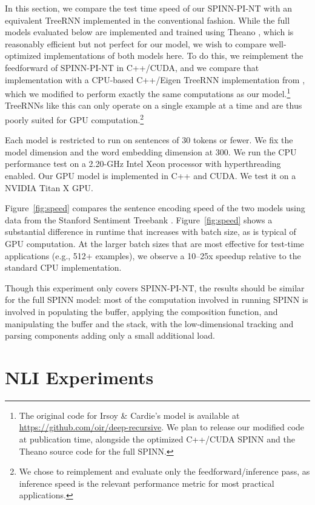 \documentclass[11pt]{article}
\begin{document}
In this section, we compare the test time speed of our SPINN-PI-NT with an equivalent TreeRNN implemented in the conventional fashion. While the full models evaluated below are implemented and trained using Theano \citep{bergstra+al:2010-scipy,Bastien-Theano-2012}, which is reasonably efficient but not perfect for our model, we wish to compare well-optimized implementations of both models here. To do this, we reimplement the feedforward of SPINN-PI-NT in C++/CUDA, and we compare that implementation with a CPU-based C++/Eigen TreeRNN implementation from \citet{irsoy2014deep}, which we modified to perform exactly the same computations as our model.\footnote{The original code for Irsoy \& Cardie's model is available at \url{https://github.com/oir/deep-recursive}. We plan to release our modified code at publication time, alongside the optimized C++/CUDA SPINN and the Theano source code for the full SPINN.} TreeRNNs like this can only operate on a single example at a time and are thus poorly suited for GPU computation.\footnote{We chose to reimplement and evaluate only the feedforward/inference pass, as inference speed is the relevant performance metric for most practical applications.}

Each model is restricted to run on sentences of 30 tokens or fewer. We fix the model dimension and the word embedding dimension at 300. We run the CPU performance test on a 2.20-GHz Intel Xeon processor with hyperthreading enabled. Our GPU model is implemented in C++ and CUDA. We test it on a NVIDIA Titan X GPU.

Figure~\ref{fig:speed} compares the sentence encoding speed of the two models using data from the Stanford Sentiment Treebank \citep{socher2013recursive}. Figure~\ref{fig:speed} shows a substantial difference in runtime that increases with batch size, as is typical of GPU computation. At the larger batch sizes that are most effective for test-time applications (e.g., 512+ examples), we observe a 10--25x speedup relative to the standard CPU implementation.

Though this experiment only covers SPINN-PI-NT, the results should be similar for the full SPINN model: most of the computation involved in running SPINN is involved in populating the buffer, applying the composition function, and manipulating the buffer and the stack, with the low-dimensional tracking and parsing components adding only a small additional load.

\section{NLI Experiments}
\end{document}
